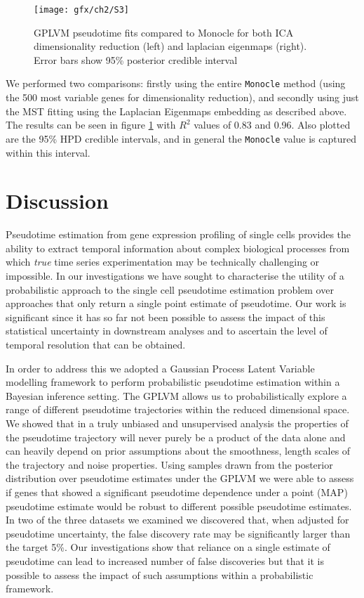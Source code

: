 \begin{figure}
\centering
	\texttt{[image: gfx/ch2/S3]}
\caption{GPLVM pseudotime fits compared to Monocle for both ICA dimensionality reduction (left) and laplacian eigenmaps (right). Error bars show 95\% posterior credible interval} \label{fig:s3}
\end{figure}

We performed two comparisons: firstly using the entire \texttt{Monocle} method (using the 500 most variable genes for dimensionality reduction), and secondly using just the MST fitting using the Laplacian Eigenmaps embedding as described above. The results can be seen in figure \ref{fig:s3} with $R^2$ values of 0.83 and 0.96. Also plotted are the 95\% HPD credible intervals, and in general the \texttt{Monocle} value is captured within this interval.


\section{Discussion}

Pseudotime estimation from gene expression profiling of single cells provides the ability to extract temporal information about complex biological processes from which \emph{true} time series experimentation may be technically challenging or impossible. In our investigations we have sought to characterise the utility of a probabilistic approach to the single cell pseudotime estimation problem over approaches that only return a single point estimate of pseudotime. Our work is significant since it has so far not been possible to assess the impact of this statistical uncertainty in downstream analyses and to ascertain the level of temporal resolution that can be obtained.

In order to address this we adopted a Gaussian Process Latent Variable modelling framework to perform probabilistic pseudotime estimation within a Bayesian inference setting. The GPLVM allows us to probabilistically explore a range of different pseudotime trajectories within the reduced dimensional space. We showed that in a truly unbiased and unsupervised analysis the properties of the pseudotime trajectory will never purely be a product of the data alone and can heavily depend on prior assumptions about the smoothness, length scales of the trajectory and noise properties. Using  samples drawn from the posterior distribution over pseudotime estimates under the GPLVM we were able to assess if genes that showed a significant pseudotime dependence under a point (MAP) pseudotime estimate would be robust to different possible pseudotime estimates. In two of the three datasets we examined we discovered that, when adjusted for pseudotime uncertainty, the false discovery rate may be significantly larger than the target 5\%. Our investigations show that reliance on a single estimate of pseudotime can lead to increased number of false discoveries but that it is possible to assess the impact of such assumptions within a probabilistic framework.

